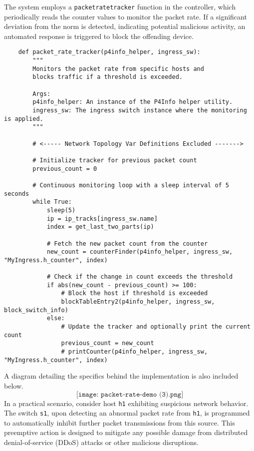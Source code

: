 The system employs a \verb|packetratetracker| function in the controller, which periodically reads the counter values to monitor the packet rate. If a significant deviation from the norm is detected, indicating potential malicious activity, an automated response is triggered to block the offending device. 
\begin{lstlisting}
    def packet_rate_tracker(p4info_helper, ingress_sw):
        """
        Monitors the packet rate from specific hosts and 
        blocks traffic if a threshold is exceeded.
        
        Args:
        p4info_helper: An instance of the P4Info helper utility.
        ingress_sw: The ingress switch instance where the monitoring is applied.
        """
        
        # <----- Network Topology Var Definitions Excluded ------->
        
        # Initialize tracker for previous packet count
        previous_count = 0
    
        # Continuous monitoring loop with a sleep interval of 5 seconds
        while True:
            sleep(5)
            ip = ip_tracks[ingress_sw.name]
            index = get_last_two_parts(ip)
    
            # Fetch the new packet count from the counter
            new_count = counterFinder(p4info_helper, ingress_sw, "MyIngress.h_counter", index)
    
            # Check if the change in count exceeds the threshold
            if abs(new_count - previous_count) >= 100:
                # Block the host if threshold is exceeded
                blockTableEntry2(p4info_helper, ingress_sw, block_switch_info)
            else:
                # Update the tracker and optionally print the current count
                previous_count = new_count
                # printCounter(p4info_helper, ingress_sw, "MyIngress.h_counter", index)
\end{lstlisting}
A diagram detailing the specifics behind the implementation is also included below.
$$
\texttt{[image: packet-rate-demo (3).png]}
$$
In a practical scenario, consider host \verb|h1| exhibiting suspicious network behavior. The switch \verb|s1|, upon detecting an abnormal packet rate from \verb|h1|, is programmed to automatically inhibit further packet transmissions from this source. This preemptive action is designed to mitigate any possible damage from distributed denial-of-service (DDoS) attacks or other malicious disruptions. 
